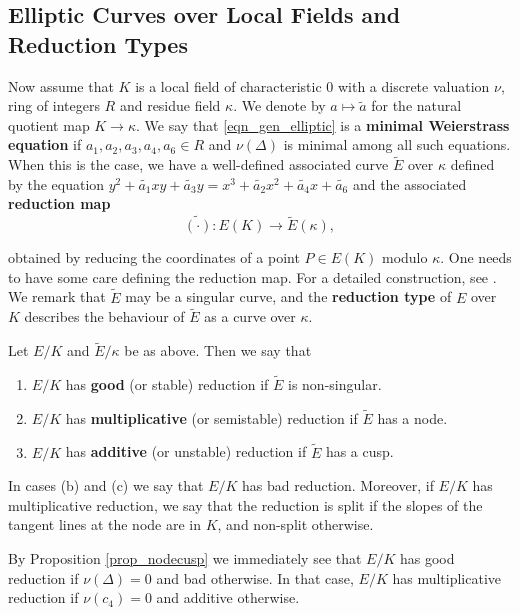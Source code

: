 \subsection{Elliptic Curves over Local Fields and Reduction Types}

Now assume that $K$ is a local field of characteristic $0$ with a discrete valuation $\nu$, ring of integers $R$ and residue field $\kappa$. We denote by $a\mapsto \tilde{a}$ for the natural quotient map $K\to\kappa$. We say that \eqref{eqn_gen_elliptic} is a \textbf{minimal Weierstrass equation} if $a_1,a_2,a_3,a_4,a_6\in R$ and $\nu(\Delta)$ is minimal among all such equations. When this is the case, we have a well-defined associated curve $\tilde{E}$ over $\kappa$ defined by the equation $y^2+\tilde{a_1}xy+\tilde{a_3}y=x^3+\tilde{a_2}x^2+\tilde{a_4}x+\tilde{a_6}$ and the associated \textbf{reduction map}
\begin{equation}\label{eqn_reduction}
    \widetilde{(\cdot)}:E(K)\longrightarrow \tilde{E}(\kappa),
\end{equation}

obtained by reducing the coordinates of a point $P\in E(K)$ modulo $\kappa$. One needs to have some care defining the reduction map. For a detailed construction, see \cite[\S1 VII.2]{S1}. We remark that $\tilde{E}$ may be a singular curve, and the \textbf{reduction type} of $E$ over $K$ describes the behaviour of $\tilde{E}$ as a curve over $\kappa$.

\begin{defn}
    Let $E/K$ and $\tilde{E}/\kappa$ be as above. Then we say that 
    \begin{enumerate}[label={(\alph*)}]
        \item $E/K$ has \textbf{good} (or stable) reduction if $\tilde{E}$ is non-singular.
        \item $E/K$ has \textbf{multiplicative} (or semistable) reduction if $\tilde{E}$ has a node.
        \item $E/K$ has \textbf{additive} (or unstable) reduction if $\tilde{E}$ has a cusp.
    \end{enumerate}
    In cases (b) and (c) we say that $E/K$ has bad reduction. Moreover, if $E/K$ has multiplicative reduction, we say that the reduction is split if the slopes of the tangent lines at the node are in $K$, and non-split otherwise.
\end{defn}

By Proposition \ref*{prop_nodecusp} we immediately see that $E/K$ has good reduction if $\nu(\Delta)=0$ and bad otherwise. In that case, $E/K$ has multiplicative reduction if $\nu(c_4)=0$ and additive otherwise.

